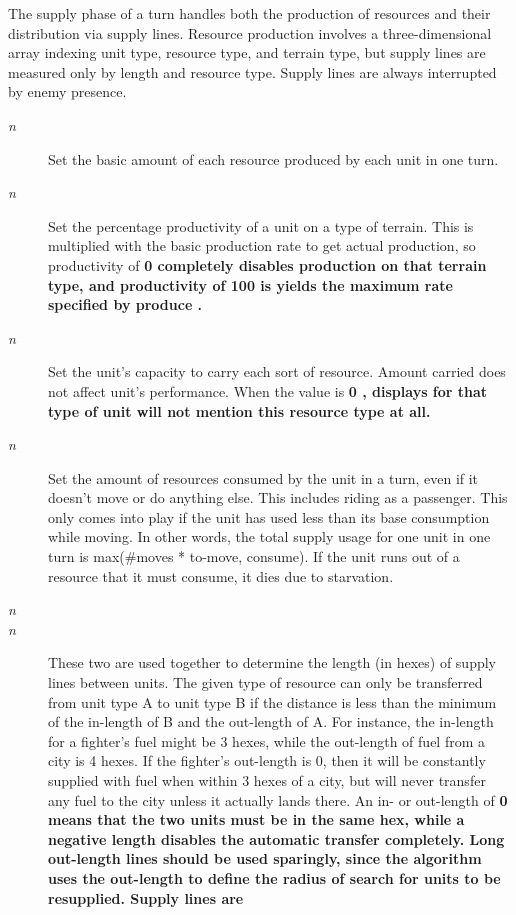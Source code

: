 The supply phase of a turn handles both the production of resources and
their distribution via supply lines.  Resource production involves a
three-dimensional array indexing unit type, resource type, and terrain
type, but supply lines are measured only by length and resource type.
Supply lines are always interrupted by enemy presence.
\begin{description}
\item[{%
\it n}]
Set the basic amount of each resource produced by each unit in one turn.
\item[{%
\it n}]
Set the percentage productivity of a unit on a type of terrain.
This is multiplied with the basic production rate to get actual
production, so productivity of %
\bf 0 \rm%
completely disables production on
that terrain type, and productivity of %
\bf 100 \rm%
is yields the maximum rate
specified by %
\bf produce\rm%
.
\item[{%
\it n}]
Set the unit's capacity to carry each sort of resource.
Amount carried does not affect unit's performance.
When the value is %
\bf 0\rm%
, displays for that type of unit will not mention
this resource type at all.
\item[{%
\it n}]
Set the amount of resources consumed by the unit in a turn, even if it
doesn't move or do anything else.  This includes riding as a passenger.
This only comes into play if the unit has used less than its base
consumption while moving.  In other words, the total supply usage for
one unit in one turn is max(\#moves * to-move, consume).
If the unit runs out of a resource that it must consume,
it dies due to starvation.
\item[{%
\it n}]
\item[{%
\it n}]
These two are used together to determine the length (in hexes) of supply lines
between units.  The given type of resource can only be transferred from
unit type A to unit type B if the distance is less than the minimum of
the in-length of B and the out-length of A.
For instance, the in-length
for a fighter's fuel might be 3 hexes, while the out-length of fuel from
a city is 4 hexes.  If the fighter's out-length is 0, then it will be
constantly supplied with fuel when within 3 hexes of a city, but will never
transfer any fuel to the city unless it actually lands there.
An in- or out-length of %
\bf 0 \rm%
means that the two units must be in the same hex,
while a negative length disables the automatic transfer completely.
Long out-length
lines should be used sparingly, since the algorithm uses the out-length to
define the radius of search for units to be resupplied.  Supply lines are

\end{description}
